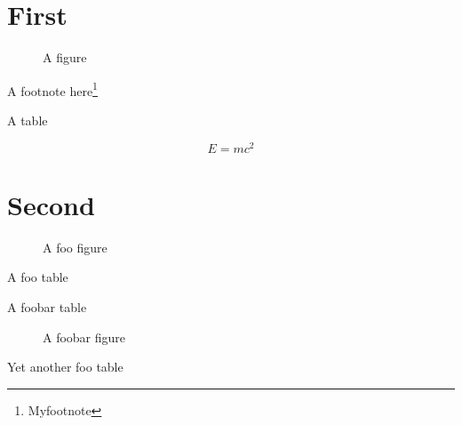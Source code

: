 \documentclass{article}
\begin{document}

\listoffigures
\listoftables

\section{First}


\blindtext[10]

\begin{figure}[!ht]

\caption{A figure}
\end{figure}

A footnote here\footnote{Myfootnote}

\blindtext[10]


\begin{table}[!ht]
\caption{A table}
\end{table}

\begin{equation}
  E=mc^2
\end{equation}

\section{Second}

\blindtext[10]

\begin{figure}[!ht]

\caption{A foo figure}
\end{figure}

\blindtext[10]


\begin{table}[!ht]
\caption{A foo table}
\end{table}



\begin{table}[!ht]
\caption{A foobar table}
\end{table}



\begin{figure}[!ht]

\caption{A foobar figure}
\end{figure}

\blindtext[10]

\begin{table}[!ht]
\caption{Yet another foo table}
\end{table}
\end{document}

